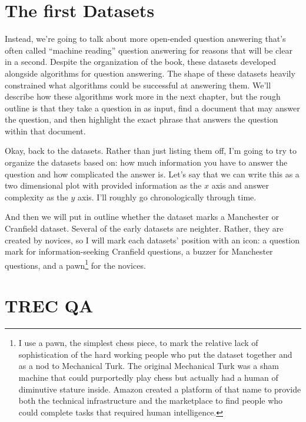 \section{The first  Datasets}

Instead, we're going to talk about more open-ended question answering
that’s often called “machine reading” question answering for reasons
that will be clear in a second.
%
Despite the organization of the book, these datasets developed
alongside algorithms for question answering.
%
The shape of these datasets heavily constrained what algorithms could
be successful at answering them.
%
We'll describe how these algorithms work more in the next chapter, but the rough outline is that they take a question in as input, find a document that may answer the question, and then highlight the exact phrase that answers the question within that document.


Okay, back to the datasets.  Rather than just listing them off, I’m
going to try to organize the datasets based on: how much information
you have to answer the question and how complicated the answer is.
Let’s say that we can write this as a two dimensional plot with
provided information as the $x$ axis and answer complexity as the $y$
axis.  I’ll roughly go chronologically through time.

And then we will put in outline whether the dataset marks a Manchester
or Cranfield dataset.  Several of the early datasets are neighter.
Rather, they are created by novices, so I will mark each datasets'
position with an icon: a question mark for information-seeking
Cranfield questions, a buzzer for Manchester questions, and a
pawn\footnote{I use a pawn, the simplest chess piece, to mark the
relative lack of sophistication of the hard working people who put the
dataset together and as a nod to Mechanical Turk.  The original
Mechanical Turk was a sham machine that could purportedly play chess
but actually had a human of diminutive stature inside.  Amazon created
a platform of that name to provide both the technical infrastructure
and the marketplace to find people who could complete tasks that
required human intelligence. } for the novices.


\section{TREC QA}

